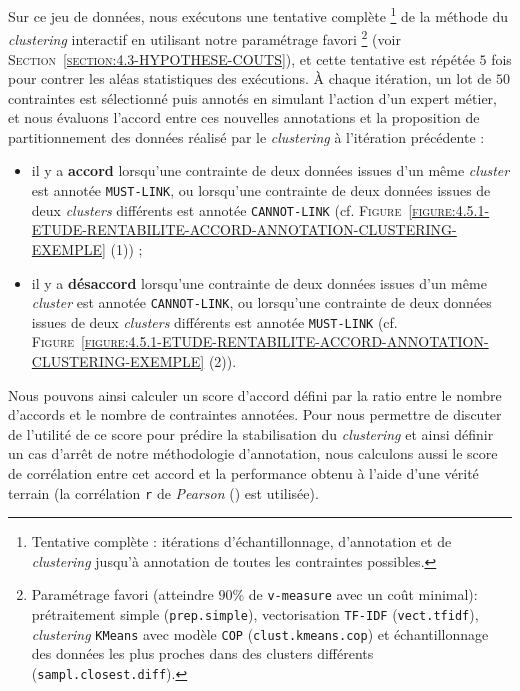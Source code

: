			Sur ce jeu de données, nous exécutons une tentative complète \footnote{
				Tentative complète : itérations d'échantillonnage, d'annotation et de \textit{clustering} jusqu'à annotation de toutes les contraintes possibles.
			}
			de la méthode du \textit{clustering} interactif en utilisant notre paramétrage favori \footnote{
				Paramétrage favori (atteindre $90$\% de \texttt{v-measure} avec un coût minimal): prétraitement simple (\texttt{prep.simple}), vectorisation \texttt{TF-IDF} (\texttt{vect.tfidf}), \textit{clustering} \texttt{KMeans} avec modèle \texttt{COP} (\texttt{clust.kmeans.cop}) et échantillonnage des données les plus proches dans des clusters différents (\texttt{sampl.closest.diff}).
			} (voir \textsc{Section~\ref{section:4.3-HYPOTHESE-COUTS}}), et cette tentative est répétée $5$ fois pour contrer les aléas statistiques des exécutions.
			À chaque itération, un lot de $50$ contraintes est sélectionné puis annotés en simulant l'action d'un expert métier, et nous évaluons l'accord entre ces nouvelles annotations et la proposition de partitionnement des données réalisé par le \textit{clustering} à l'itération précédente :
			\begin{itemize}
				\item il y a \textbf{accord} lorsqu'une contrainte de deux données issues d'un même \textit{cluster} est annotée \texttt{MUST-LINK}, ou lorsqu'une contrainte de deux données issues de deux \textit{clusters} différents est annotée \texttt{CANNOT-LINK} (cf. \textsc{Figure~\ref{figure:4.5.1-ETUDE-RENTABILITE-ACCORD-ANNOTATION-CLUSTERING-EXEMPLE} (1)}) ;
				\item il y a \textbf{désaccord} lorsqu'une contrainte de deux données issues d'un même \textit{cluster} est annotée \texttt{CANNOT-LINK}, ou lorsqu'une contrainte de deux données issues de deux \textit{clusters} différents est annotée \texttt{MUST-LINK} (cf. \textsc{Figure~\ref{figure:4.5.1-ETUDE-RENTABILITE-ACCORD-ANNOTATION-CLUSTERING-EXEMPLE} (2)}).
			\end{itemize}
			Nous pouvons ainsi calculer un score d'accord défini par la ratio entre le nombre d'accords et le nombre de contraintes annotées.
			Pour nous permettre de discuter de l'utilité de ce score pour prédire la stabilisation du \textit{clustering} et ainsi définir un cas d'arrêt de notre méthodologie d'annotation, nous calculons aussi le score de corrélation entre cet accord et la performance obtenu à l'aide d'une vérité terrain (la corrélation \texttt{r} de \textit{Pearson} (\cite{kirch:2008:pearson-correlation-coefficient}) est utilisée).

